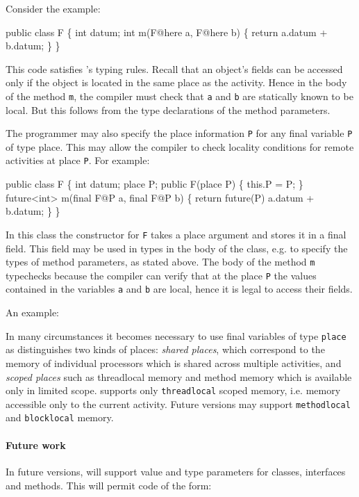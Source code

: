 Consider the example:
\begin{x10}
public class F \{
  int datum;
  int m(F@here a, F@here b) \{
    return a.datum + b.datum;
 \}
\}
\end{x10}
This code satisfies \Xten{}'s typing rules. Recall that 
an object's fields can be accessed only if the object is located in 
the same place as the activity. Hence in the body of the method
{\tt m}, the compiler must check that {\tt a} and {\tt b} are statically
known to be local. But this follows from the type declarations
of the method parameters. 

The programmer may also specify the place information {\tt P} for any
final variable {\tt P} of type place. This may allow the compiler to
check locality conditions for remote activities at place {\tt P}. For
example:
\begin{x10}
public class F \{
  int datum;
  place P;
  public F(place P) \{
    this.P = P;
  \}
  future<int> m(final F@P a, final F@P b) \{
    return future(P) {a.datum + b.datum;}
  \}
\}
\end{x10}
In this class the constructor for {\tt F} takes a place argument and
stores it in a final field. This field may be used in types in the
body of the class, e.g.{} to specify the types of method parameters,
as stated above. The body of the method {\tt m} typechecks because the
compiler can verify that at the place {\tt P} the values contained in
the variables {\tt a} and {\tt b} are local, hence it is legal to 
access their fields. 

An example:

In many circumstances it becomes necessary to use final variables of type
{\tt place} as 
\Xten{} distinguishes two kinds of places: {\em shared
places}\label{SharedPlaces}, which correspond to
the memory of individual processors which is shared across multiple
activities, and {\em scoped
places}\label{ScopedPlaces} such as threadlocal
memory and method memory which is available only in limited
scope. \XtenCurrVer{} supports only {\tt threadlocal} scoped memory,
i.e.{} memory accessible only to the current activity.  Future
versions may support {\tt methodlocal} and {\tt blocklocal} memory.

\paragraph{ Future work }

In future versions, \Xten{} will support value and type parameters for
classes, interfaces and methods. This will permit code of the form:

